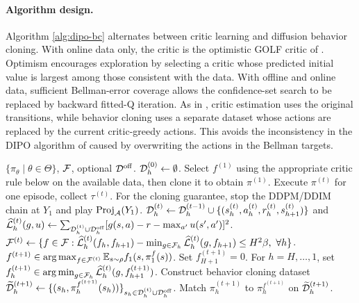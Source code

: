 \paragraph{Algorithm design.} Algorithm \ref{alg:dipo-bc} alternates between critic learning and diffusion behavior cloning. With online data only,
the critic is the optimistic GOLF critic of \citet{jin2021bellmaneluder}. Optimism encourages exploration by selecting a critic whose predicted initial value is largest among those consistent with the data. With offline and online data, sufficient Bellman-error coverage allows the confidence-set
search to be replaced by backward fitted-Q iteration. As in \citet{li2024learningmultimodalbehaviorsscratch}, critic
estimation uses the original transitions, while behavior cloning uses a separate dataset whose actions
are replaced by the current critic-greedy actions. This avoids the inconsistency in the DIPO algorithm of \citet{yang2023policyrepresentationdiffusionprobability} caused by overwriting
the actions in the Bellman targets.

\begin{algorithm}[t]
    \caption{}
    \begin{algorithmic}[1]
             $\{\pi_\theta \mid \theta \in \Theta \}$, ${\mathcal{F}}$, optional ${\mathcal{D}}^{{\operatorname{off}}}$. 
             ${\mathcal{D}}_h^{(0)}\gets\emptyset$. Select $f^{(1)}$ using the appropriate critic rule below on the available data, then clone it to obtain $\pi^{(1)}$.  
            \STATE Execute $\pi^{(t)}$ for one episode, collect $\tau^{(t)}$. For the cloning guarantee, stop the DDPM/DDIM chain at $Y_1$ and play $\operatorname{Proj}_{{\mathcal{A}}}(Y_1)$.
            \STATE ${\mathcal{D}}_h^{(t)}\gets{\mathcal{D}}_h^{(t-1)}\cup\{(s_h^{(t)},a_h^{(t)},r_h^{(t)},s_{h+1}^{(t)})\}$ and $\widehat{{\mathcal{L}}}_h^{(t)}(g,u)\gets\sum_{{\mathcal{D}}_h^{(t)}\cup{\mathcal{D}}_h^{{\operatorname{off}}}}[g(s,a)-r-\max_{a'}u(s',a')]^2$.
            \STATE 
            ${\mathcal{F}}^{(t)}\gets\{f\in{\mathcal{F}}:\widehat{{\mathcal{L}}}_h^{(t)}(f_h,f_{h+1})-\min_{g\in{\mathcal{F}}_h}\widehat{{\mathcal{L}}}_h^{(t)}(g,f_{h+1})\le H^2\beta,\ \forall h\}$.
        \STATE $f^{(t+1)}\in\operatorname*{arg\,max}_{f\in{\mathcal{F}}^{(t)}}\mathbb{E}_{s\sim\rho}f_1(s,\pi_1^f(s))$.
        \ELSE 
        \STATE Set $f_{H+1}^{(t+1)}=0$. For $h=H,\ldots,1$, set $f_h^{(t+1)}\in\operatorname*{arg\,min}_{g\in{\mathcal{F}}_h}\widehat{{\mathcal{L}}}_h^{(t)}(g,f_{h+1}^{(t+1)})$.
        \ENDIF
        \STATE Construct behavior cloning dataset \\
        $\textstyle{\widetilde{{\mathcal{D}}}_h^{(t+1)} \gets \{(s_h, \pi_h^{f^{(t+1)}}(s_h))\}_{s_h \in {\mathcal{D}}_h^{(t)} \cup {\mathcal{D}}_h^{{\operatorname{off}}}}}$.
        \STATE Match $\pi_h^{(t+1)}$ to $\pi_h^{f^{(t+1)}}$ on $\widetilde{{\mathcal{D}}}_h^{(t+1)}$.
        \ENDFOR
    
    \end{algorithmic}
\label{alg:dipo-bc}
\end{algorithm}

